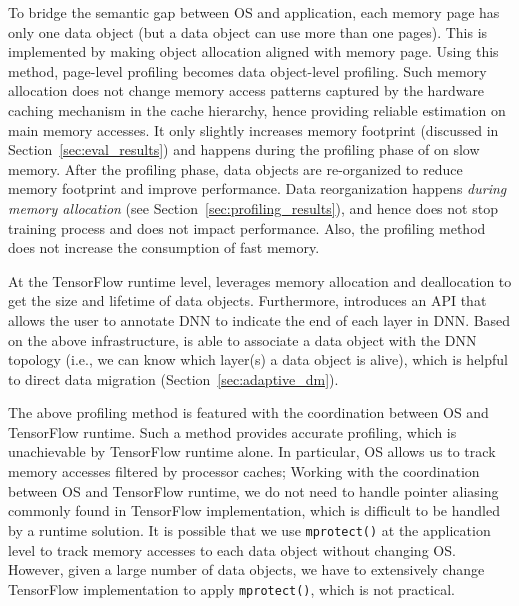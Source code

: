 To bridge the semantic gap between OS and application, each memory page has only one data object (but a data object can use more than one pages). \textcolor{check}{This is implemented by making object allocation aligned with memory page.} Using this method, page-level profiling becomes data object-level profiling. Such memory allocation does not change memory access patterns captured by the hardware caching mechanism in the cache hierarchy, hence providing reliable estimation on main memory accesses. %
It only slightly increases memory footprint (discussed in Section~\ref{sec:eval_results}) and happens during the profiling phase of \name on slow memory.
After the profiling phase, data objects are re-organized to reduce memory footprint and improve performance. Data reorganization happens \textit{during memory allocation} (see Section~\ref{sec:profiling_results}), and hence does not stop training process and does not impact performance. Also, the profiling method does not increase the consumption of fast memory. 


At the TensorFlow runtime level, \name leverages memory allocation and deallocation to get the size and lifetime of data objects. Furthermore, \name introduces an API that allows the user to annotate DNN to indicate the end of each layer in DNN.
Based on the above infrastructure, \name is able to associate a data object with the DNN topology (i.e., we can know which layer(s) a data object is alive), 
which is helpful to direct data migration (Section~\ref{sec:adaptive_dm}). 

\textcolor{check}{The above profiling method is featured with the coordination between OS and TensorFlow runtime. Such a method provides accurate profiling, which is unachievable by TensorFlow runtime alone. In particular, OS allows us to track memory accesses filtered by processor caches; Working with the coordination between OS and TensorFlow runtime, we do not need to handle pointer aliasing commonly found in TensorFlow implementation, which is difficult to be handled by a runtime solution. It is possible that we use \texttt{mprotect()} at the application level to track memory accesses to each data object without changing OS. However, given a large number of data objects, we have to extensively change TensorFlow implementation to apply \texttt{mprotect()}, which is not practical.}


